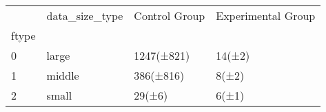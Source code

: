 \begin{tabular}{llll}
\toprule
{} & data\_size\_type & Control Group & Experimental Group \\
ftype \\
\midrule
0 &          large &    1247(±821) &             14(±2) \\
1 &         middle &     386(±816) &              8(±2) \\
2 &          small &        29(±6) &              6(±1) \\
\bottomrule
\end{tabular}
